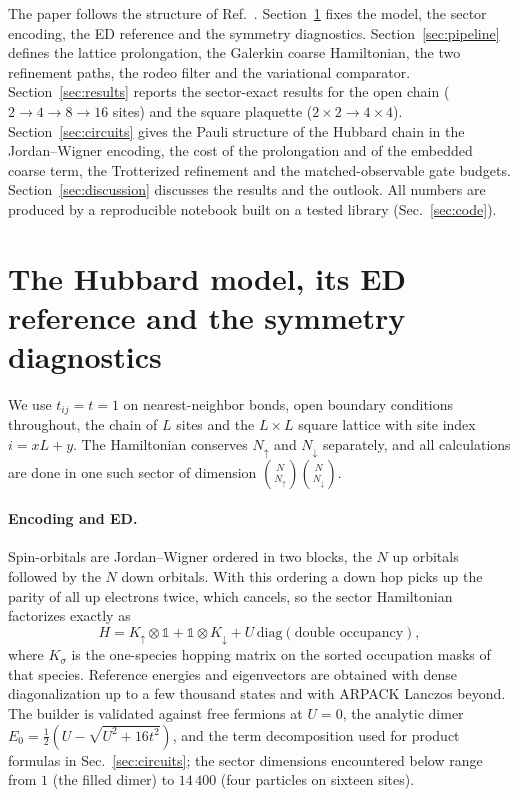 \documentclass[
  aps,
  prc,
  reprint,
  superscriptaddress,
  floatfix,
  nofootinbib
]{revtex4-2}
\begin{document}
The paper follows the structure of Ref.~\cite{EigenQPairing2026}.
Section~\ref{sec:model} fixes the model, the sector encoding, the ED
reference and the symmetry diagnostics.  Section~\ref{sec:pipeline} defines
the lattice prolongation, the Galerkin coarse Hamiltonian, the two refinement
paths, the rodeo filter and the variational comparator.
Section~\ref{sec:results} reports the sector-exact results for the open chain
($2\to4\to8\to16$ sites) and the square plaquette ($2\times2\to4\times4$).
Section~\ref{sec:circuits} gives the Pauli structure of the Hubbard chain in
the Jordan--Wigner encoding, the cost of the prolongation and of the embedded
coarse term, the Trotterized refinement and the matched-observable gate budgets.
Section~\ref{sec:discussion} discusses the results and the outlook.  All
numbers are produced by a reproducible notebook built on a tested library
(Sec.~\ref{sec:code}).

\section{The Hubbard model, its ED reference and the symmetry diagnostics}
\label{sec:model}
We use $t_{ij}=t=1$ on nearest-neighbor bonds, open boundary conditions
throughout, the chain of $L$ sites and the $L\times L$ square lattice with
site index $i=xL+y$.  The Hamiltonian conserves $N_\uparrow$ and
$N_\downarrow$ separately, and all calculations are done in one such sector
of dimension $\binom{N}{N_\uparrow}\binom{N}{N_\downarrow}$.

\paragraph{Encoding and ED.}
Spin-orbitals are Jordan--Wigner ordered in two blocks, the $N$ up orbitals
followed by the $N$ down orbitals.  With this ordering a down hop picks up
the parity of all up electrons twice, which cancels, so the sector
Hamiltonian factorizes exactly as
\begin{equation}
  H=K_\uparrow\otimes\mathbb 1+\mathbb 1\otimes K_\downarrow
   +U\,\mathrm{diag}(\text{double occupancy}),
  \label{eq:kron}
\end{equation}
where $K_\sigma$ is the one-species hopping matrix on the sorted occupation
masks of that species.  Reference energies and eigenvectors are obtained
with dense diagonalization up to a few thousand states and with ARPACK
Lanczos beyond.  The builder is validated against free fermions at $U=0$,
the analytic dimer $E_0=\tfrac12(U-\sqrt{U^2+16t^2})$, and the term
decomposition used for product formulas in Sec.~\ref{sec:circuits}; the
sector dimensions encountered below range from $1$ (the filled dimer) to
$14\,400$ (four particles on sixteen sites).
\end{document}
